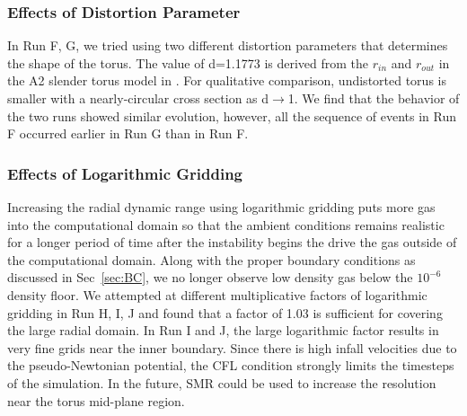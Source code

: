 \documentclass[iop,revtex4]{emulateapj}
\begin{document}
\subsubsection{Effects of Distortion Parameter}
\par In Run F, G, we tried using two different distortion parameters that determines the shape of the torus. The value of d=1.1773 is derived from the $r_{in}$ and $r_{out}$ in the A2 slender torus model in \cite{Hawley:1991A}. For qualitative comparison, undistorted torus is smaller with a nearly-circular cross section as d$\rightarrow$1. We find that the behavior of the two runs showed similar evolution, however, all the sequence of events in Run F occurred earlier in Run G than in Run F.

\subsubsection{Effects of Logarithmic Gridding}
\par  Increasing the radial dynamic range using logarithmic gridding puts more gas into the computational domain so that the ambient conditions remains realistic for a longer period of time after the instability begins the drive the gas outside of the computational domain. Along with the proper boundary conditions as discussed in Sec~\ref{sec:BC}, we no longer observe low density gas below the $10^{-6}$ density floor. We attempted at different multiplicative factors of logarithmic gridding in Run H, I, J and found that a factor of 1.03 is sufficient for covering the large radial domain. In Run I and J, the large logarithmic factor results in very fine grids near the inner boundary. Since there is high infall velocities due to the pseudo-Newtonian potential, the \ac{CFL} condition strongly limits the timesteps of the simulation. In the future, \ac{SMR} could be used to increase the resolution near the torus mid-plane region.
\end{document}
